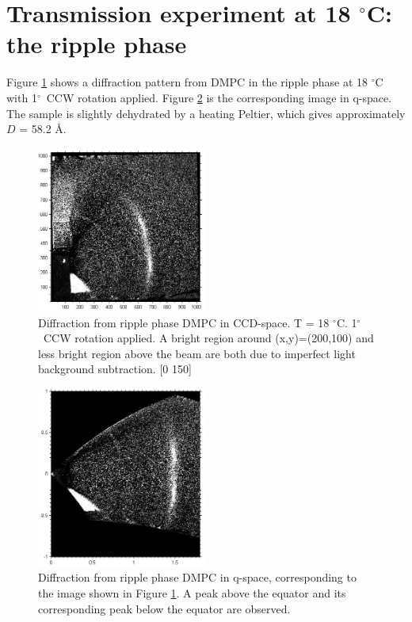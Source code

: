 \documentclass[letterpaper,12pt]{article}
\newcommand{\dg}{$^{\circ}$}%
\begin{document}
\section{Transmission experiment at 18 \dg C: the ripple phase}
Figure \ref{fig:RippleCCDRot} shows a diffraction pattern from DMPC in the ripple phase at 18 \dg C with 1\dg\ CCW rotation applied. Figure \ref{fig:RippleTransRot} is the corresponding image in q-space. The sample is slightly dehydrated by a heating Peltier, which gives approximately $D$ = 58.2 \AA.
\begin{figure}[htbp]
	\centering
	\includegraphics[width=0.5\textwidth]{ripple_t52_rot}
	\caption[Diffraction from ripple phase DMPC in CCD-space]{Diffraction from ripple phase DMPC in CCD-space. T = 18 \dg C. 1\dg\ CCW rotation applied. A bright region around (x,y)=(200,100) and less bright region above the beam are both due to imperfect light background subtraction. [0 150]}
	\label{fig:RippleCCDRot}
\end{figure}
\begin{figure}[htbp]
	\centering
	\includegraphics[width=0.5\textwidth]{ripple_t52_rot_trans}
	\caption[Diffraction from ripple phase DMPC in q-space]{Diffraction from ripple phase DMPC in q-space, corresponding to the image shown in Figure \ref{fig:RippleCCDRot}. A peak above the equator and its corresponding peak below the equator are observed.}
	\label{fig:RippleTransRot}
\end{figure}
\end{document}

